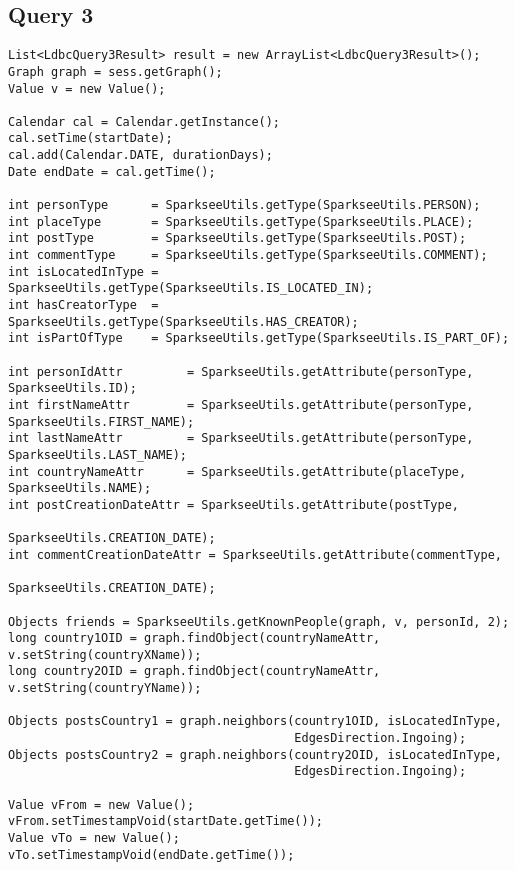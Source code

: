 \subsection{Query 3}

{\footnotesize
\begin{verbatim}
List<LdbcQuery3Result> result = new ArrayList<LdbcQuery3Result>();
Graph graph = sess.getGraph();
Value v = new Value();

Calendar cal = Calendar.getInstance();
cal.setTime(startDate);
cal.add(Calendar.DATE, durationDays);
Date endDate = cal.getTime();

int personType      = SparkseeUtils.getType(SparkseeUtils.PERSON);
int placeType       = SparkseeUtils.getType(SparkseeUtils.PLACE);
int postType        = SparkseeUtils.getType(SparkseeUtils.POST);
int commentType     = SparkseeUtils.getType(SparkseeUtils.COMMENT);
int isLocatedInType = SparkseeUtils.getType(SparkseeUtils.IS_LOCATED_IN);
int hasCreatorType  = SparkseeUtils.getType(SparkseeUtils.HAS_CREATOR);
int isPartOfType    = SparkseeUtils.getType(SparkseeUtils.IS_PART_OF);

int personIdAttr         = SparkseeUtils.getAttribute(personType, SparkseeUtils.ID);
int firstNameAttr        = SparkseeUtils.getAttribute(personType, SparkseeUtils.FIRST_NAME);
int lastNameAttr         = SparkseeUtils.getAttribute(personType, SparkseeUtils.LAST_NAME);
int countryNameAttr      = SparkseeUtils.getAttribute(placeType,  SparkseeUtils.NAME);
int postCreationDateAttr = SparkseeUtils.getAttribute(postType, 
                                                         SparkseeUtils.CREATION_DATE);
int commentCreationDateAttr = SparkseeUtils.getAttribute(commentType,
                                                         SparkseeUtils.CREATION_DATE);

Objects friends = SparkseeUtils.getKnownPeople(graph, v, personId, 2);
long country1OID = graph.findObject(countryNameAttr, v.setString(countryXName));
long country2OID = graph.findObject(countryNameAttr, v.setString(countryYName));

Objects postsCountry1 = graph.neighbors(country1OID, isLocatedInType, 
                                        EdgesDirection.Ingoing);
Objects postsCountry2 = graph.neighbors(country2OID, isLocatedInType, 
                                        EdgesDirection.Ingoing);

Value vFrom = new Value();
vFrom.setTimestampVoid(startDate.getTime());
Value vTo = new Value();
vTo.setTimestampVoid(endDate.getTime());


\end{verbatim}}
